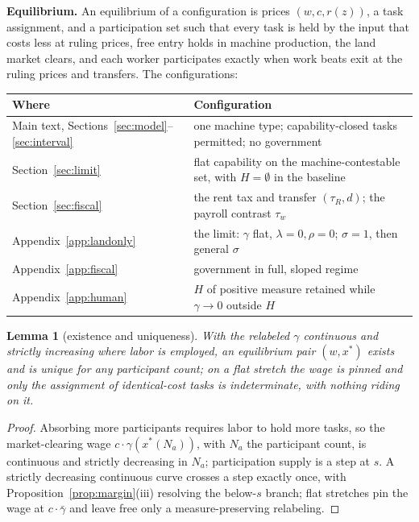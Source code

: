 \documentclass[12pt]{article}
\theoremstyle{plain}
\newtheorem{lemma}[proposition]{Lemma}
\begin{document}
\textbf{Equilibrium.} An equilibrium of a configuration is prices $(w,c,r(z))$, a task assignment, and a participation set such that every task is held by the input that costs less at ruling prices, free entry holds in machine production, the land market clears, and each worker participates exactly when work beats exit at the ruling prices and transfers. The configurations:

\begin{center}
{\small
\begin{tabular}{l p{8.6cm}}
\toprule
Where & Configuration \\
\midrule
Main text, Sections~\ref{sec:model}--\ref{sec:interval}
& one machine type; capability-closed tasks permitted; no government \\
Section~\ref{sec:limit}
& flat capability on the machine-contestable set, with $H=\emptyset$ in the baseline \\
Section~\ref{sec:fiscal} & the rent tax and transfer $(\tau _R,d)$; the payroll contrast $\tau _w$ \\
Appendix~\ref{app:landonly} & the limit: $\gamma$ flat, $\lambda = 0, \rho = 0$; $\sigma = 1$, then general $\sigma$ \\
Appendix~\ref{app:fiscal} & government in full, sloped regime \\
Appendix~\ref{app:human}
& $H$ of positive measure retained while $\gamma\to0$ outside $H$ \\
\bottomrule
\end{tabular}
}
\end{center}

\begin{lemma}[existence and uniqueness]\label{lem:existence}
With the relabeled $\gamma$ continuous and strictly increasing where labor is employed, an equilibrium pair $(w, x^*)$ exists and is unique for any participant count; on a flat stretch the wage is pinned and only the assignment of identical-cost tasks is indeterminate, with nothing riding on it.
\end{lemma}

\begin{proof}
Absorbing more participants requires labor to hold more tasks, so the market-clearing wage $c\cdot \gamma (x^*(N_a))$, with $N_a$ the participant count, is continuous and strictly decreasing in $N_a$; participation supply is a step at $s$. A strictly decreasing continuous curve crosses a step exactly once, with Proposition~\ref{prop:margin}(iii) resolving the below-$s$ branch; flat stretches pin the wage at $c\cdot \bar{\gamma}$ and leave free only a measure-preserving relabeling.
\end{proof}
\end{document}
